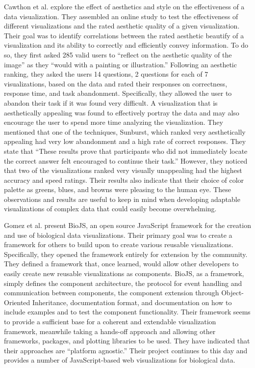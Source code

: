 Cawthon et al. \cite{aesthetic} explore the effect of aesthetics and style on the effectiveness of a data visualization.  They assembled an online study to test the effectiveness of different visualizations and the rated aesthetic quality of a given visualization.  Their goal was to identify correlations between the rated aesthetic beautify of a visualization and its ability to correctly and efficiently convey information.  To do so, they first asked 285 valid users to “reflect on the aesthetic quality of the image” as they “would with a painting or illustration.”  Following an aesthetic ranking, they asked the users 14 questions, 2 questions for each of 7 visualizations, based on the data and rated their responses on correctness, response time, and task abandonment.  Specifically, they allowed the user to abandon their task if it was found very difficult.  A visualization that is aesthetically appealing was found to effectively portray the data and may also encourage the user to spend more time analyzing the visualization.  They mentioned that one of the techniques, Sunburst, which ranked very aesthetically appealing had very low abandonment and a high rate of correct responses.  They state that “These results prove that participants who did not immediately locate the correct answer felt encouraged to continue their task.”  However, they noticed that two of the visualizations ranked very visually unappealing had the highest accuracy and speed ratings.  Their results also indicate that their choice of color palette as greens, blues, and browns were pleasing to the human eye.  These observations and results are useful to keep in mind when developing adaptable visualizations of complex data that could easily become overwhelming. \par
Gomez et al. \cite{biojs} present BioJS, an open source JavaScript framework for the creation and use of biological data visualizations.  Their primary goal was to create a framework for others to build upon to create various reusable visualizations.  Specifically, they opened the framework entirely for extension by the community.  They defined a framework that, once learned, would allow other developers to easily create new reusable visualizations as components.  BioJS, as a framework, simply defines the component architecture, the protocol for event handling and communication between components, the component extension through Object-Oriented Inheritance, documentation format, and documentation on how to include examples and to test the component functionality.  Their framework seems to provide a sufficient base for a coherent and extendable visualization framework, meanwhile taking a hands-off approach and allowing other frameworks, packages, and plotting libraries to be used.  They have indicated that their approaches are ``platform agnostic.''  Their project continues to this day and provides a number of JavaScript-based web visualizations for biological data. \par
